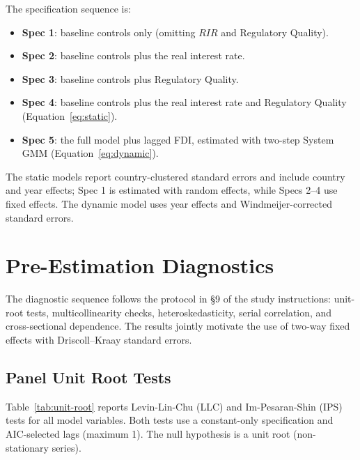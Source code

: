 The specification sequence is:

\begin{itemize}
    \item \textbf{Spec 1}: baseline controls only (omitting $\mathit{RIR}$ and Regulatory Quality).
    \item \textbf{Spec 2}: baseline controls plus the real interest rate.
    \item \textbf{Spec 3}: baseline controls plus Regulatory Quality.
    \item \textbf{Spec 4}: baseline controls plus the real interest rate and Regulatory Quality (Equation~\ref{eq:static}).
    \item \textbf{Spec 5}: the full model plus lagged FDI, estimated with two-step System GMM (Equation~\ref{eq:dynamic}).
\end{itemize}

The static models report country-clustered standard errors and include country and year effects; Spec 1 is estimated with random effects, while Specs 2--4 use fixed effects. The dynamic model uses year effects and Windmeijer-corrected standard errors.

\section{Pre-Estimation Diagnostics}
\label{sec:diagnostics}

The diagnostic sequence follows the protocol in §9 of the study instructions: unit-root tests, multicollinearity checks, heteroskedasticity, serial correlation, and cross-sectional dependence. The results jointly motivate the use of two-way fixed effects with Driscoll--Kraay standard errors.

\subsection{Panel Unit Root Tests}
\label{subsec:unit-root}

Table~\ref{tab:unit-root} reports Levin-Lin-Chu (LLC) and Im-Pesaran-Shin (IPS) tests for all model variables. Both tests use a constant-only specification and AIC-selected lags (maximum 1). The null hypothesis is a unit root (non-stationary series).

